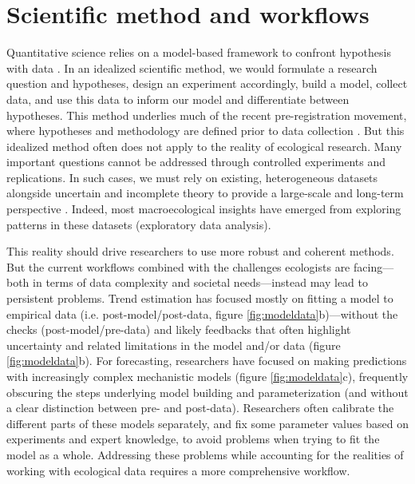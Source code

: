 \documentclass[11pt]{article}
\newcommand{\llabel}[1]{\hypertarget{lintarget:#1}{}\linelabel{lin:#1}}
\begin{document}
\section{Scientific method and workflows}

Quantitative science relies on a model-based framework to confront hypothesis with data \citep{Chamberlin:1965cd}. In an idealized scientific method, we would formulate a research question and hypotheses, design an experiment accordingly, build a model, collect data, and use this data to inform our model and differentiate between hypotheses. This method underlies much of the recent pre-registration movement, where hypotheses and methodology are defined prior to data collection \citep{Nosek2018}.
But this idealized method often does not apply to the reality of ecological research. Many important questions cannot be addressed through controlled experiments and replications. In such cases, we must rely on existing, heterogeneous datasets alongside uncertain and incomplete theory to provide a large-scale and long-term perspective \citep{Hilborn1997}. Indeed, most macroecological insights have emerged from exploring patterns in these datasets (exploratory data analysis).

This reality should drive researchers to use more robust and coherent methods. But the current workflows combined with the challenges ecologists are facing---both in terms of data complexity and societal needs---instead may lead to persistent problems.
Trend estimation has focused mostly on fitting a model to empirical data (\llabel{quad1}i.e. post-model/post-data, figure \ref{fig:modeldata}b)---without the checks (\llabel{quad2}post-model/pre-data) and likely feedbacks that often highlight uncertainty and related limitations in the model and/or data (figure \ref{fig:modeldata}b). For forecasting, researchers have focused on making predictions with increasingly complex mechanistic models (figure \ref{fig:modeldata}c), frequently obscuring the steps underlying model building and parameterization (\llabel{quad3}and without a clear distinction between pre- and post-data). Researchers often calibrate the different parts of these models separately, and fix some parameter values based on experiments and expert knowledge, to avoid problems when trying to fit the model as a whole.
Addressing these problems while accounting for the realities of working with ecological data requires a more comprehensive workflow.
\end{document}
